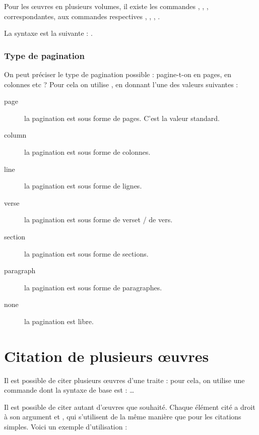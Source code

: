 \begin{plusloins}
Pour les œuvres en plusieurs volumes, il existe les commandes , , ,  correspondantes, aux commandes respectives , , , .

La syntaxe est la suivante : .
\end{plusloins}

\subsubsection{Type de pagination}

On peut préciser le type de pagination possible : pagine-t-on en pages, en colonnes etc ? Pour cela on utilise  , en donnant l'une des valeurs suivantes : 

\begin{description}
\item[page] la pagination est sous forme de pages. C'est la valeur standard.
\item[column] la pagination est sous forme de colonnes.
\item[line] la pagination est sous forme de lignes.
\item[verse] la pagination est sous forme de verset / de vers. 
\item[section] la pagination est sous forme de sections.
\item[paragraph] la pagination est sous forme de paragraphes.
\item[none] la pagination est libre.
\end{description}


\section{Citation de plusieurs œuvres}\label{citemultiple}

Il est possible de citer plusieurs œuvres d'une traite : pour cela, on utilise une commande dont la syntaxe de base est :  …

Il est possible de citer autant d'œuvres que souhaité. Chaque élément cité a droit à son argument  et , qui s'utilisent de la même manière que pour les citations simples.
Voici un exemple d'utilisation : 

